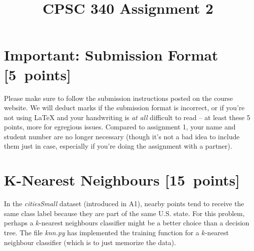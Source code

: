 \documentclass{article}
\newcommand{\blu}[1]{{\textcolor{blu}{#1}}}
\let\ask\blu
\newcommand\pts[1]{\textcolor{pointscolour}{[#1~points]}}
\begin{document}
    \title{CPSC 340 Assignment 2}
    \author{}
    \date{}
    \maketitle
    \vspace{-4em}


    \section*{Important: Submission Format \pts{5}}

    Please make sure to follow the submission instructions posted on the course website.
    \ask{We will deduct marks if the submission format is incorrect, or if you're not using \LaTeX{} and your handwriting is \emph{at all} difficult to read} -- at least these 5 points, more for egregious issues.
    Compared to assignment 1, your name and student number are no longer necessary (though it's not a bad idea to include them just in case, especially if you're doing the assignment with a partner).

    \section{K-Nearest Neighbours \pts{15}}

    In the \emph{citiesSmall} dataset (introduced in A1), nearby points tend to receive the same class label because they are part of the same U.S. state. For this problem, perhaps a $k$-nearest neighbours classifier might be a better choice than a decision tree. The file \emph{knn.py} has implemented the training function for a $k$-nearest neighbour classifier (which is to just memorize the data).
\end{document}
